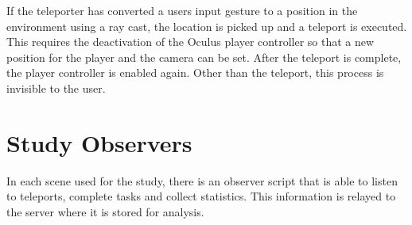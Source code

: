 If the teleporter has converted a users input gesture to a position in the environment using a ray cast, the location is picked up and a teleport is executed. This requires the deactivation of the Oculus player controller so that a new position for the player and the camera can be set. After the teleport is complete, the player controller is enabled again. Other than the teleport, this process is invisible to the user. 

\section{Study Observers}
In each scene used for the study, there is an observer script that is able to listen to teleports, complete tasks and collect statistics. This information is relayed to the server where it is stored for analysis.